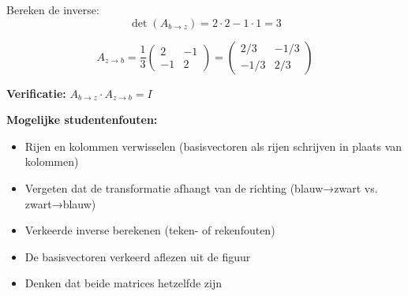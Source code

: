 \documentclass{ximera}
\begin{document}
\begin{freeResponse}
Bereken de inverse:
$$\det(A_{b \to z}) = 2 \cdot 2 - 1 \cdot 1 = 3$$

$$A_{z \to b} = \frac{1}{3} \begin{pmatrix} 2 & -1 \\ -1 & 2 \end{pmatrix} = \begin{pmatrix} 2/3 & -1/3 \\ -1/3 & 2/3 \end{pmatrix}$$

\textbf{Verificatie:} $A_{b \to z} \cdot A_{z \to b} = I$

\textbf{Mogelijke studentenfouten:}
\begin{itemize}
\item Rijen en kolommen verwisselen (basisvectoren als rijen schrijven in plaats van kolommen)
\item Vergeten dat de transformatie afhangt van de richting (blauw→zwart vs. zwart→blauw)
\item Verkeerde inverse berekenen (teken- of rekenfouten)
\item De basisvectoren verkeerd aflezen uit de figuur
\item Denken dat beide matrices hetzelfde zijn
\end{itemize}
\end{freeResponse}
\end{document}
